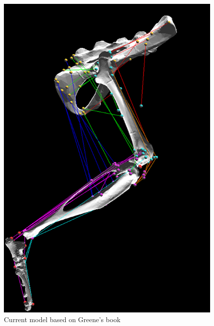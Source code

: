 \documentclass[runningheads,a4paper]{llncs}
\begin{document}
\begin{figure}
\begin{minipage}{0.5\textwidth}
					\includegraphics[width=\textwidth]{att3.PNG}
					\caption{Current model based on Greene's book}
				\end{minipage}
			\end{figure}
			
\end{document}
